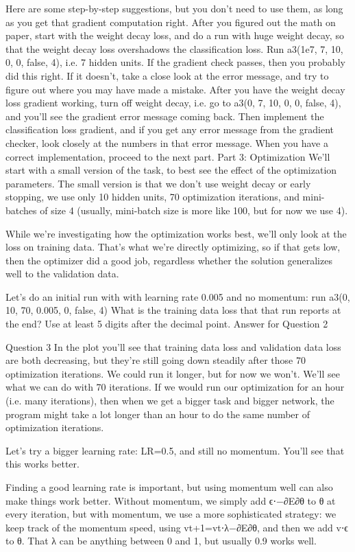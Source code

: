 Here are some step-by-step suggestions, but you don't need to use them, as long as you get that gradient computation right.
After you figured out the math on paper, start with the weight decay loss, and do a run with huge weight decay, so that the weight decay loss overshadows the classification loss. Run a3(1e7, 7, 10, 0, 0, false, 4), i.e. 7 hidden units. If the gradient check passes, then you probably did this right. If it doesn't, take a close look at the error message, and try to figure out where you may have made a mistake.
After you have the weight decay loss gradient working, turn off weight decay, i.e. go to a3(0, 7, 10, 0, 0, false, 4), and you'll see the gradient error message coming back.
Then implement the classification loss gradient, and if you get any error message from the gradient checker, look closely at the numbers in that error message. When you have a correct implementation, proceed to the next part.
Part 3: Optimization
We'll start with a small version of the task, to best see the effect of the optimization parameters. The small version is that we don't use weight decay or early stopping, we use only 10 hidden units, 70 optimization iterations, and mini-batches of size 4 (usually, mini-batch size is more like 100, but for now we use 4).

While we're investigating how the optimization works best, we'll only look at the loss on training data. That's what we're directly optimizing, so if that gets low, then the optimizer did a good job, regardless whether the solution generalizes well to the validation data.

Let's do an initial run with with learning rate 0.005 and no momentum: run a3(0, 10, 70, 0.005, 0, false, 4)
What is the training data loss that that run reports at the end? Use at least 5 digits after the decimal point.
Answer for Question 2

Question 3
In the plot you'll see that training data loss and validation data loss are both decreasing, but they're still going down steadily after those 70 optimization iterations. We could run it longer, but for now we won't. We'll see what we can do with 70 iterations. If we would run our optimization for an hour (i.e. many iterations), then when we get a bigger task and bigger network, the program might take a lot longer than an hour to do the same number of optimization iterations.

Let's try a bigger learning rate: LR=0.5, and still no momentum. You'll see that this works better.

Finding a good learning rate is important, but using momentum well can also make things work better. Without momentum, we simply add ϵ⋅−∂E∂θ to θ at every iteration, but with momentum, we use a more sophisticated strategy: we keep track of the momentum speed, using vt+1=vt⋅λ−∂E∂θ, and then we add v⋅ϵ to θ. That λ can be anything between 0 and 1, but usually 0.9 works well.


